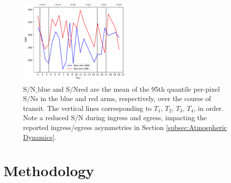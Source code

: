 \documentclass[twocolumn]{aastex631}
\begin{document}
        \begin{figure}
            \centering
            \includegraphics[width=0.5\textwidth]{plots/SNR.pdf}
            \caption{$\text{S/N_{blue}}$ and $\text{S/N{red}}$ are the mean of the 95th quantile per-pixel S/Ns in the blue and red arms, respectively, over the course of transit. The vertical lines corresponding to $T_1$, $T_2$, $T_3$, $T_4$, in order. Note a reduced S/N during ingress and egress, impacting the reported ingress/egress asymmetries in Section \ref{subsec:Atmospheric Dynamics}.}
            \label{fig:SNR}
        \end{figure}
        
    
    \section{Methodology}\label{sec:Methodology}
\end{document}
